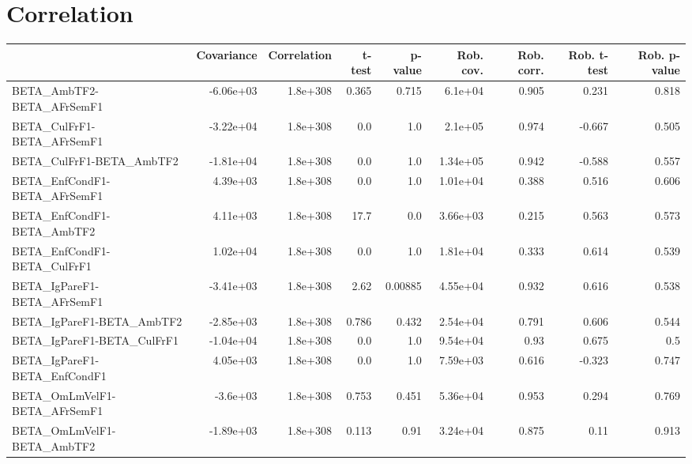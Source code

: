 \section{Correlation}
\begin{tabular}{lrrrrrrrr}
\toprule
{} &  Covariance &  Correlation &  t-test &  p-value &  Rob. cov. &  Rob. corr. &  Rob. t-test &  Rob. p-value \\
\midrule
BETA\_AmbTF2-BETA\_AFrSemF1             &   -6.06e+03 &     1.8e+308 &   0.365 &    0.715 &    6.1e+04 &       0.905 &        0.231 &         0.818 \\
BETA\_CulFrF1-BETA\_AFrSemF1            &   -3.22e+04 &     1.8e+308 &     0.0 &      1.0 &    2.1e+05 &       0.974 &       -0.667 &         0.505 \\
BETA\_CulFrF1-BETA\_AmbTF2              &   -1.81e+04 &     1.8e+308 &     0.0 &      1.0 &   1.34e+05 &       0.942 &       -0.588 &         0.557 \\
BETA\_EnfCondF1-BETA\_AFrSemF1          &    4.39e+03 &     1.8e+308 &     0.0 &      1.0 &   1.01e+04 &       0.388 &        0.516 &         0.606 \\
BETA\_EnfCondF1-BETA\_AmbTF2            &    4.11e+03 &     1.8e+308 &    17.7 &      0.0 &   3.66e+03 &       0.215 &        0.563 &         0.573 \\
BETA\_EnfCondF1-BETA\_CulFrF1           &    1.02e+04 &     1.8e+308 &     0.0 &      1.0 &   1.81e+04 &       0.333 &        0.614 &         0.539 \\
BETA\_IgPareF1-BETA\_AFrSemF1           &   -3.41e+03 &     1.8e+308 &    2.62 &  0.00885 &   4.55e+04 &       0.932 &        0.616 &         0.538 \\
BETA\_IgPareF1-BETA\_AmbTF2             &   -2.85e+03 &     1.8e+308 &   0.786 &    0.432 &   2.54e+04 &       0.791 &        0.606 &         0.544 \\
BETA\_IgPareF1-BETA\_CulFrF1            &   -1.04e+04 &     1.8e+308 &     0.0 &      1.0 &   9.54e+04 &        0.93 &        0.675 &           0.5 \\
BETA\_IgPareF1-BETA\_EnfCondF1          &    4.05e+03 &     1.8e+308 &     0.0 &      1.0 &   7.59e+03 &       0.616 &       -0.323 &         0.747 \\
BETA\_OmLmVelF1-BETA\_AFrSemF1          &    -3.6e+03 &     1.8e+308 &   0.753 &    0.451 &   5.36e+04 &       0.953 &        0.294 &         0.769 \\
BETA\_OmLmVelF1-BETA\_AmbTF2            &   -1.89e+03 &     1.8e+308 &   0.113 &     0.91 &   3.24e+04 &       0.875 &         0.11 &         0.913 \\

\end{tabular}
